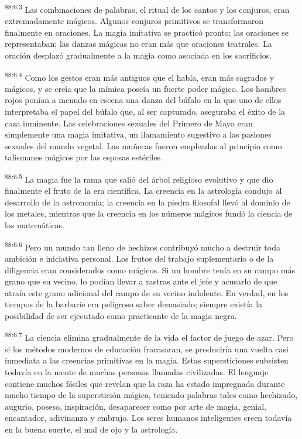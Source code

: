 \par
\textsuperscript{88:6.3} Las combinaciones de palabras, el ritual de los cantos y los conjuros, eran extremadamente mágicos. Algunos conjuros primitivos se transformaron finalmente en oraciones. La magia imitativa se practicó pronto; las oraciones se representaban; las danzas mágicas no eran más que oraciones teatrales. La oración desplazó gradualmente a la magia como asociada en los sacrificios.

\par
\textsuperscript{88:6.4} Como los gestos eran más antiguos que el habla, eran más sagrados y mágicos, y se creía que la mímica poseía un fuerte poder mágico. Los hombres rojos ponían a menudo en escena una danza del búfalo en la que uno de ellos interpretaba el papel del búfalo que, al ser capturado, aseguraba el éxito de la caza inminente. Las celebraciones sexuales del Primero de Mayo eran simplemente una magia imitativa, un llamamiento sugestivo a las pasiones sexuales del mundo vegetal. Las muñecas fueron empleadas al principio como talismanes mágicos por las esposas estériles.

\par
\textsuperscript{88:6.5} La magia fue la rama que salió del árbol religioso evolutivo y que dio finalmente el fruto de la era científica. La creencia en la astrología condujo al desarrollo de la astronomía; la creencia en la piedra filosofal llevó al dominio de los metales, mientras que la creencia en los números mágicos fundó la ciencia de las matemáticas.

\par
\textsuperscript{88:6.6} Pero un mundo tan lleno de hechizos contribuyó mucho a destruir toda ambición e iniciativa personal. Los frutos del trabajo suplementario o de la diligencia eran considerados como mágicos. Si un hombre tenía en su campo más grano que su vecino, lo podían llevar a rastras ante el jefe y acusarlo de que atraía este grano adicional del campo de su vecino indolente. En verdad, en los tiempos de la barbarie era peligroso saber demasiado; siempre existía la posibilidad de ser ejecutado como practicante de la magia negra.

\par
\textsuperscript{88:6.7} La ciencia elimina gradualmente de la vida el factor de juego de azar. Pero si los métodos modernos de educación fracasaran, se produciría una vuelta casi inmediata a las creencias primitivas en la magia. Estas supersticiones subsisten todavía en la mente de muchas personas llamadas civilizadas. El lenguaje contiene muchos fósiles que revelan que la raza ha estado impregnada durante mucho tiempo de la superstición mágica, teniendo palabras tales como hechizado, augurio, poseso, inspiración, desaparecer como por arte de magia, genial, encantador, adivinanza y embrujo. Los seres humanos inteligentes creen todavía en la buena suerte, el mal de ojo y la astrología.

